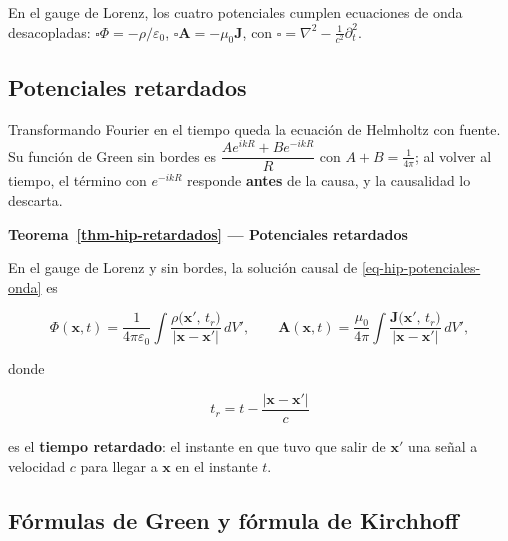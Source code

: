 \documentclass[
  spanish,
  a4paper,
]{scrbook}
\theoremstyle{definition}
\theoremstyle{plain}
\theoremstyle{definition}
\theoremstyle{plain}
\theoremstyle{definition}
\theoremstyle{remark}
\begin{document}
En el gauge de Lorenz, los cuatro potenciales cumplen ecuaciones de onda
desacopladas: \(\square\Phi = -\rho/\varepsilon_0\),
\(\square\mathbf A = -\mu_0\mathbf J\), con
\(\square = \nabla^2 - \tfrac1{c^2}\partial_t^2\).

\subsection{Potenciales retardados}\label{sec-hip-resumen-8}

Transformando Fourier en el tiempo queda la ecuación de Helmholtz con
fuente. Su función de Green sin bordes es
\(\dfrac{Ae^{ikR}+Be^{-ikR}}{R}\) con \(A+B = \tfrac{1}{4\pi}\); al
volver al tiempo, el término con \(e^{-ikR}\) responde \textbf{antes} de
la causa, y la causalidad lo descarta.

\begin{tcolorbox}[enhanced jigsaw, arc=.35mm, bottomrule=.15mm, breakable, colback=white, colframe=quarto-callout-note-color-frame, left=2mm, leftrule=.75mm, opacityback=0, rightrule=.15mm, toprule=.15mm]
\begin{minipage}[t]{5.5mm}
\textcolor{quarto-callout-note-color}{\faInfo}
\end{minipage}%
\begin{minipage}[t]{\textwidth - 5.5mm}

\vspace{-3mm}\textbf{Teorema~\ref{thm-hip-retardados} --- Potenciales retardados}\vspace{3mm}

En el gauge de Lorenz y sin bordes, la solución causal de
\ref{eq-hip-potenciales-onda} es

\[
\Phi(\mathbf x,t) = \frac{1}{4\pi\varepsilon_0}\int\frac{\rho\big(\mathbf x',\,t_r\big)}{|\mathbf x-\mathbf x'|}\,dV',
\qquad
\mathbf A(\mathbf x,t) = \frac{\mu_0}{4\pi}\int\frac{\mathbf J\big(\mathbf x',\,t_r\big)}{|\mathbf x-\mathbf x'|}\,dV',
\]

donde

\[
t_r = t - \frac{|\mathbf x - \mathbf x'|}{c}
\]

es el \textbf{tiempo retardado}: el instante en que tuvo que salir de
\(\mathbf x'\) una señal a velocidad \(c\) para llegar a \(\mathbf x\)
en el instante \(t\).

\end{minipage}%
\end{tcolorbox}

\subsection{Fórmulas de Green y fórmula de
Kirchhoff}\label{sec-hip-resumen-9}
\end{document}
